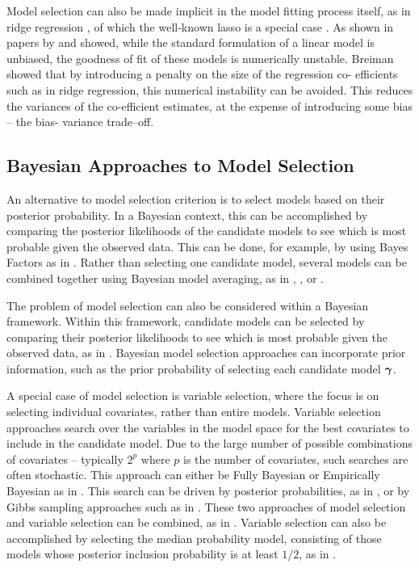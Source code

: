 \documentclass{amsart}[12pt]
\begin{document}
Model selection can also be made implicit in the model fitting process itself, as in ridge regression
\citep{Casella1980}, of which the well-known lasso is a special case \citep{Tibshirani1996}. As shown in
papers by \citep{Breiman1996} and \citep{Efron2013} showed, while  the standard formulation of a linear model
is unbiased, the goodness of fit of these models is numerically  unstable. Breiman showed that by introducing
a penalty on the size of the regression co- efficients such as  in ridge regression, this numerical
instability can be avoided. This reduces the variances of the co-efficient estimates, at the expense of
introducing some bias -- the bias- variance trade--off.

\subsection{Bayesian Approaches to Model Selection}
An alternative to model selection criterion is to select models based on their posterior probability. In a
Bayesian context, this can be accomplished by comparing the posterior likelihoods of the candidate models to
see which is most probable given the observed data. This can be done, for example, by using Bayes Factors as
in \citep{Kass1993}. Rather than selecting one candidate model, several models can be combined together using
Bayesian model averaging, as in \citep{Hoeting1999}, \citep{Raftery1997}, \citep{Fernandez2001} or
\citep{Papaspiliopoulos2016}.

The problem of model selection can also be considered within a Bayesian framework.
Within this framework, candidate models can be selected by comparing their posterior likelihoods to see
which is most probable given the observed data, as in \citep{Kass1993}. Bayesian model selection approaches
can incorporate prior information, such as the prior probability of selecting each candidate model ${\boldsymbol \gamma}$.

A special case of model selection is variable selection, where the focus is on selecting individual
covariates, rather than entire models. Variable selection approaches search over the
variables in the model space for the best covariates to include in the candidate model. Due to the large
number of possible combinations of covariates -- typically $2^p$ where $p$ is the number of covariates, such
searches are often stochastic. This approach can either be Fully Bayesian or Empirically Bayesian as in
\citep{Cui2008}.  This search can be driven by posterior probabilities, as in \citep{Casella2006}, or by Gibbs
sampling approaches such as in \citep{George1993}. These two approaches of model selection and variable
selection can be combined, as in \citep{Geweke1996}. Variable selection can also be accomplished by selecting
the median probability model, consisting of those models whose posterior inclusion probability is at least
$1/2$, as in \citep{Barbieri2004}.
\end{document}
